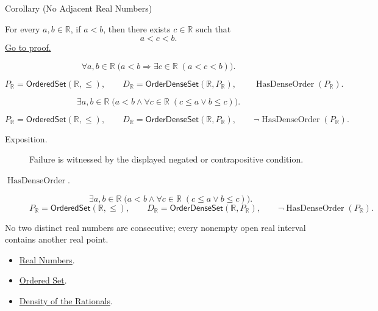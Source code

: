 \begin{corollarybox}{Corollary (No Adjacent Real Numbers)}
\begin{corollary}
\label{cor:no-adjacent-real-numbers}
For every $a,b\in\mathbb{R}$, if $a<b$, then there exists
$c\in\mathbb{R}$ such that
\[
  a<c<b.
\]
\hyperref[prf:no-adjacent-real-numbers]{Go to proof.}
\end{corollary}
\end{corollarybox}
\begin{remark*}
\[
\forall a,b\in\mathbb{R}\;\bigl(a<b\Longrightarrow
\exists c\in\mathbb{R}\;(a<c<b)\bigr).
\]
\end{remark*}
\begin{remark*}
\[
P_{\mathbb{R}}=\mathsf{OrderedSet}(\mathbb{R},\leq),\qquad
D_{\mathbb{R}}=\mathsf{OrderDenseSet}(\mathbb{R},P_{\mathbb{R}}),\qquad
\operatorname{HasDenseOrder}(P_{\mathbb{R}}).
\]
\end{remark*}
\begin{remark*}
\[
\exists a,b\in\mathbb{R}\;
\bigl(a<b\land \forall c\in\mathbb{R}\;(c\le a\lor b\le c)\bigr).
\]
\end{remark*}
\begin{remark*}
\[
P_{\mathbb{R}}=\mathsf{OrderedSet}(\mathbb{R},\leq),\qquad
D_{\mathbb{R}}=\mathsf{OrderDenseSet}(\mathbb{R},P_{\mathbb{R}}),\qquad
\neg\operatorname{HasDenseOrder}(P_{\mathbb{R}}).
\]
\end{remark*}

\begin{remark*}
\begin{description}
  \item[Exposition.]
  Failure is witnessed by the displayed negated or contrapositive condition.

  \item[\(\operatorname{HasDenseOrder}.\)]
  \[
\exists a,b\in\mathbb{R}\;
\bigl(a<b\land \forall c\in\mathbb{R}\;(c\le a\lor b\le c)\bigr).
\]
\[
P_{\mathbb{R}}=\mathsf{OrderedSet}(\mathbb{R},\leq),\qquad
D_{\mathbb{R}}=\mathsf{OrderDenseSet}(\mathbb{R},P_{\mathbb{R}}),\qquad
\neg\operatorname{HasDenseOrder}(P_{\mathbb{R}}).
\]
\end{description}
\end{remark*}
\begin{remark*}[Interpretation]
No two distinct real numbers are consecutive; every nonempty open real interval
contains another real point.
\end{remark*}
\begin{dependencies}
\begin{itemize}
\item \hyperref[def:reals]{Real Numbers}.
\item \hyperref[def:ordered-set]{Ordered Set}.
\item \hyperref[thm:density-of-rationals-in-reals]{Density of the Rationals}.
\end{itemize}
\end{dependencies}

